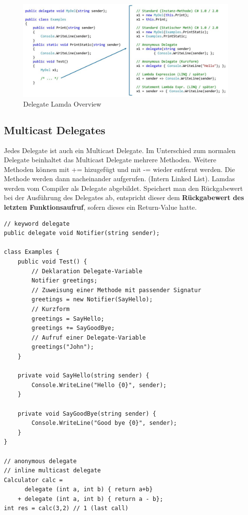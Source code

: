 \documentclass[
a4paper,
oneside,
10pt,
fleqn,
headsepline,
toc=listofnumbered, 
bibliography=totocnumbered]{scrartcl}
\begin{document}
\begin{figure}[ht]
	\centering
	\includegraphics[width=0.9\linewidth]{images/delegate_lamda_overview}
	\caption{Delegate Lamda Overview}
\end{figure}

\subsection{Multicast Delegates}
Jedes Delegate ist auch ein Multicast Delegate. Im Unterschied zum normalen Delegate beinhaltet das Multicast Delegate mehrere Methoden. Weitere Methoden können mit += hizugefügt und mit -= wieder entfernt werden. Die Methode werden dann nacheinander aufgerufen. (Intern Linked List). Lamdas werden vom Compiler als Delegate abgebildet.  Speichert man den Rückgabewert bei der Ausführung des Delegates ab, entspricht dieser dem \textbf{Rückgabewert des letzten Funktionsaufruf}, sofern dieses ein Return-Value hatte.
\begin{lstlisting}
// keyword delegate
public delegate void Notifier(string sender);

class Examples {
	public void Test() {
		// Deklaration Delegate-Variable
		Notifier greetings; 
		// Zuweisung einer Methode mit passender Signatur
		greetings = new Notifier(SayHello); 
		// Kurzform
		greetings = SayHello;
		greetings += SayGoodBye;
		// Aufruf einer Delegate-Variable
		greetings("John");
	}

	private void SayHello(string sender) {
		Console.WriteLine("Hello {0}", sender);
	}
	
	private void SayGoodBye(string sender) {
		Console.WriteLine("Good bye {0}", sender);
	}
} 

// anonymous delegate
// inline multicast delegate
Calculator calc =  
	  delegate (int a, int b) { return a+b}
	+ delegate (int a, int b) { return a - b};
int res = calc(3,2) // 1 (last call)
\end{lstlisting}
\end{document}
